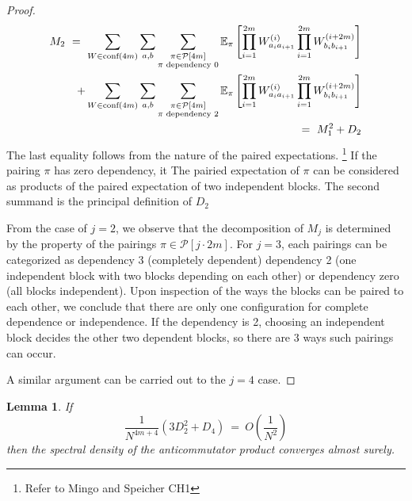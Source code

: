 \documentclass[12pt,reqno]{amsart}
\theoremstyle{plain} %
\newtheorem{lemma}[theorem]{Lemma}
\theoremstyle{remark}
\theoremstyle{definition}
\newcommand{\E}{\mathbb E}
\begin{document}
\begin{proof}
\begin{eqnarray}
    \begin{split}
    M_2 \ = \ 
    \sum_{W \in \PW(4m)} \sum_{a, b} \sum_{\substack{\pi \in \mathcal{P}[4m]\\
    \pi \textnormal{ dependency 0}
    }} 
    \E_\pi\left[
        \prod_{i = 1}^{2m} 
            W^{(i)}_{a_ia_{i + 1}}
        \prod_{i = 1}^{2m}
W^{(i + 2m)}_{b_ib_{i + 1}}
    \right] \\
    + 
\sum_{W \in \PW(4m)} \sum_{a, b} \sum_{\substack{\pi \in \mathcal{P}[4m]\\
    \pi \textnormal{ dependency 2}
}} 
    \E_\pi\left[
        \prod_{i = 1}^{2m} 
            W^{(i)}_{a_ia_{i + 1}}
        \prod_{i = 1}^{2m}
W^{(i + 2m)}_{b_ib_{i + 1}}
    \right] 
    \end{split} \\ 
    \ = \ M_1^2 + D_2
\end{eqnarray}
The last equality follows from the nature of the paired expectations. 
\footnote{Refer to Mingo and Speicher CH1} If the pairing $\pi$ has zero dependency, it 
The pairied expectation of $\pi$ can be considered as products of 
the paired expectation of two independent blocks. The second summand 
is the principal definition of $D_2$

From the case of $j = 2$, we observe that the decomposition of $M_j$ 
is determined by the property of the pairings $\pi \in \mathcal P[j\cdot 2m]$. 
For $j = 3$, each pairings can be categorized as dependency 3 (completely dependent) 
dependency 2 (one independent block with two blocks depending on each other)
or dependency zero (all blocks independent). Upon inspection of the ways 
the blocks can be paired to each other, we conclude that there are 
only one configuration for complete dependence or independence. 
If the dependency is 2, choosing an independent block decides 
the other two dependent blocks, so there are 3 ways such pairings can occur. 

A similar argument can be carried out to the $j = 4$ case. 

\end{proof}

\begin{lemma}\label{thm:Dependencies}
    If 
    \begin{equation}\label{eqn:simpleForthMom}
        \frac 1 {N^{4m + 4}} (3D_2^2 + D_4) \ = \ O\left(
            \frac 1 {N^2}
        \right)
    \end{equation}
    then the spectral density of the anticommutator product converges almost surely. 
\end{lemma}
\end{document}
